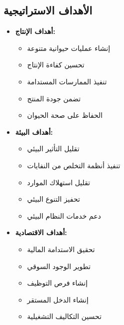 \subsection{الأهداف الاستراتيجية}
\begin{itemize}
    \item \textbf{أهداف الإنتاج:}
    \begin{itemize}
        \item إنشاء عمليات حيوانية متنوعة
        \item تحسين كفاءة الإنتاج
        \item تنفيذ الممارسات المستدامة
        \item تضمن جودة المنتج
        \item الحفاظ على صحة الحيوان
    \end{itemize}
    
    \item \textbf{أهداف البيئة:}
    \begin{itemize}
        \item تقليل التأثير البيئي
        \item تنفيذ أنظمة التخلص من النفايات
        \item تقليل استهلاك الموارد
        \item تحفيز التنوع البيئي
        \item دعم خدمات النظام البيئي
    \end{itemize}
    
    \item \textbf{أهداف الاقتصادية:}
    \begin{itemize}
        \item تحقيق الاستدامة المالية
        \item تطوير الوجود السوقي
        \item إنشاء فرص التوظيف
        \item إنشاء الدخل المستقر
        \item تحسين التكاليف التشغيلية
    \end{itemize}
\end{itemize}

